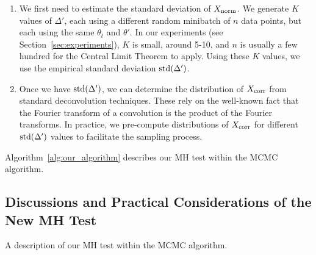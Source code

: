 \documentclass{article}
\begin{document}
\begin{enumerate}[noitemsep]
    \item We first need to estimate the standard deviation of $X_{\rm norm}$. We generate $K$ values
    of $\Delta'$, each using a different random minibatch of $n$ data points, but each using the
    same $\theta_t$ and $\theta'$. In our experiments (see Section~\ref{sec:experiments}), $K$ is
    small, around 5-10, and $n$ is usually a few hundred for the Central Limit Theorem to apply.
    Using these $K$ values, we use the empirical standard deviation ${\rm std}(\Delta')$.

    \item Once we have ${\rm std}(\Delta')$, we can determine the distribution of $X_{\rm corr}$
    from standard deconvolution techniques. These rely on the well-known fact that the Fourier
    transform of a convolution is the product of the Fourier transforms. In practice, we pre-compute
    distributions of $X_{\rm corr}$ for different ${\rm std}(\Delta')$ values to facilitate the
    sampling process.
\end{enumerate}

Algorithm~\ref{alg:our_algorithm} describes our MH test within the MCMC algorithm.

\subsection{Discussions and Practical Considerations of the New MH Test}\label{ssec:discussion}

\begin{algorithm}[t]
\caption{A description of our MH test within the MCMC algorithm.}
\label{alg:our_algorithm}
\end{algorithm}
\end{document}
